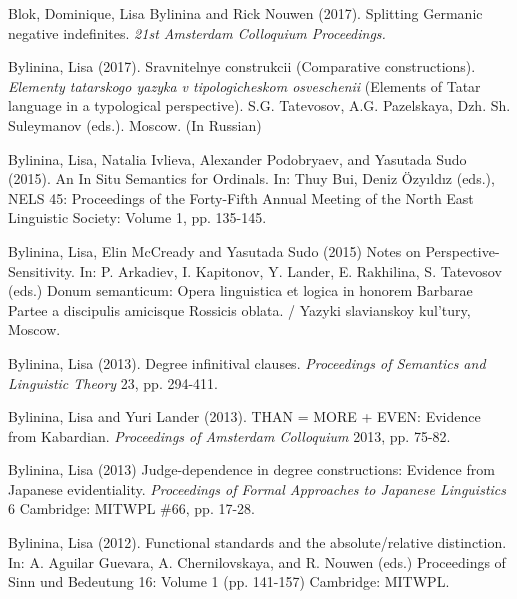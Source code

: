\documentclass[12pt,letterpaper]{article}
\begin{document}
{\begin{hangparas}{.25in}{1}
\vspace{1mm} 

Blok, Dominique, Lisa Bylinina and Rick Nouwen (2017). Splitting Germanic negative indefinites. {\it 21st Amsterdam Colloquium Proceedings.}

Bylinina, Lisa (2017). Sravnitelnye construkcii (Comparative constructions). {\it Elementy tatarskogo yazyka v tipologicheskom osveschenii} (Elements of Tatar language in a typological perspective). S.G. Tatevosov, A.G. Pazelskaya, Dzh. Sh. Suleymanov (eds.). Moscow. (In Russian)

\vspace{1mm}

Bylinina, Lisa, Natalia Ivlieva, Alexander Podobryaev, and Yasutada Sudo (2015).
An In Situ Semantics for Ordinals. In: Thuy Bui, Deniz \"{O}zy{\i}ld{\i}z (eds.), NELS 45: Proceedings of the Forty-Fifth Annual Meeting of the North East Linguistic Society: Volume 1, pp. 135-145.

\vspace{1mm}

Bylinina, Lisa, Elin McCready and Yasutada Sudo (2015) Notes on Perspective-Sensitivity. In: P. Arkadiev, I. Kapitonov, Y. Lander, E. Rakhilina, S. Tatevosov (eds.) 
Donum semanticum: Opera linguistica et logica in honorem Barbarae Partee a discipulis amicisque Rossicis oblata. / Yazyki slavianskoy kul'tury, Moscow. 

\vspace{1mm}

Bylinina, Lisa (2013). Degree infinitival clauses. {\it Proceedings of Semantics and Linguistic Theory} 23, pp. 294-411.

\vspace{1mm}

Bylinina, Lisa and Yuri Lander (2013). THAN = MORE + EVEN: Evidence from Kabardian. {\it Proceedings of Amsterdam Colloquium} 2013, pp. 75-82. 

\vspace{1mm}

Bylinina, Lisa (2013) Judge-dependence in degree constructions: Evidence from Japanese evidentiality. {\it Proceedings of Formal Approaches to Japanese Linguistics} 6 Cambridge: MITWPL \#66, pp. 17-28.

\vspace{1mm}

Bylinina, Lisa (2012). Functional standards and the absolute/relative distinction. In: A. Aguilar Guevara, A. Chernilovskaya, and R. Nouwen (eds.) Proceedings of Sinn und Bedeutung 16: Volume 1 (pp. 141-157) Cambridge: MITWPL. 


\end{hangparas}}
\end{document}
